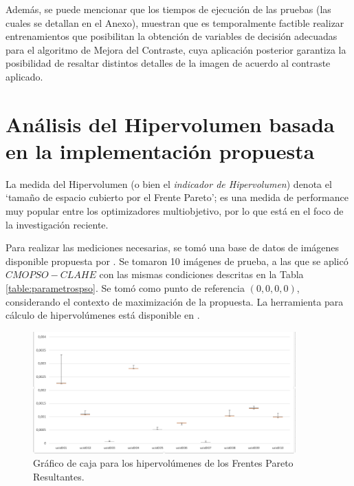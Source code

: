 Además, se puede mencionar que los tiempos de ejecución de las pruebas (las cuales se detallan en el Anexo), muestran que es temporalmente factible realizar entrenamientos que posibilitan la obtención de variables de decisión adecuadas para el algoritmo de Mejora del Contraste, cuya aplicación posterior garantiza la posibilidad de resaltar distintos detalles de la imagen de acuerdo al contraste aplicado.

\section{Análisis del Hipervolumen basada en la implementación propuesta}

La medida del Hipervolumen (o bien el \textit{indicador de  Hipervolumen}) denota el `tamaño de espacio cubierto por el Frente Pareto'\cite{zitzler2007hypervolume}; es una medida de performance muy popular entre los optimizadores multiobjetivo, por lo que está en el foco de la investigación reciente\cite{while2005heuristics,while2006faster}.

Para realizar las mediciones necesarias, se tomó una base de datos de imágenes disponible propuesta por \cite{schaefer2003ucid}. Se tomaron 10 imágenes de prueba, a las que se aplicó $CMOPSO-CLAHE$ con las mismas condiciones descritas en la Tabla \ref{table:parametrospso}. Se tomó como punto de referencia $(0,0,0,0)$, considerando el contexto de maximización de la propuesta. La herramienta para cálculo de hipervolúmenes está disponible en \cite{izzo2012pygmo}.

\begin{figure}[H]
    \centering
    \includegraphics[width=0.90\textwidth]{./Figures/grafico-de-caja.PNG}


    \caption{Gráfico de caja para los hipervolúmenes de los Frentes Pareto Resultantes.}\label{fig:graficocaja1}
\end{figure}

